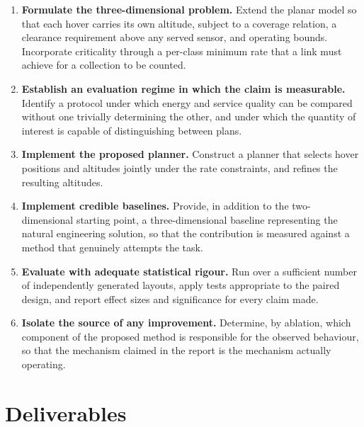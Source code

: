 \begin{enumerate}
\item \textbf{Formulate the three-dimensional problem.} Extend the planar model so that each hover carries its own altitude, subject to a coverage relation, a clearance requirement above any served sensor, and operating bounds. Incorporate criticality through a per-class minimum rate that a link must achieve for a collection to be counted.

\item \textbf{Establish an evaluation regime in which the claim is measurable.} Identify a protocol under which energy and service quality can be compared without one trivially determining the other, and under which the quantity of interest is capable of distinguishing between plans.

\item \textbf{Implement the proposed planner.} Construct a planner that selects hover positions and altitudes jointly under the rate constraints, and refines the resulting altitudes.

\item \textbf{Implement credible baselines.} Provide, in addition to the two-dimensional starting point, a three-dimensional baseline representing the natural engineering solution, so that the contribution is measured against a method that genuinely attempts the task.

\item \textbf{Evaluate with adequate statistical rigour.} Run over a sufficient number of independently generated layouts, apply tests appropriate to the paired design, and report effect sizes and significance for every claim made.

\item \textbf{Isolate the source of any improvement.} Determine, by ablation, which component of the proposed method is responsible for the observed behaviour, so that the mechanism claimed in the report is the mechanism actually operating.
\end{enumerate}

\section{Deliverables}

